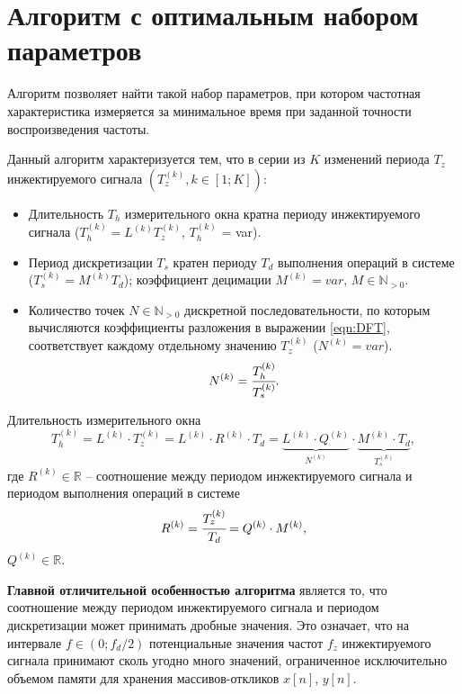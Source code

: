 \section{Алгоритм с оптимальным набором параметров}\label{sec:fr_optim}

Алгоритм позволяет найти такой набор параметров, при котором частотная характеристика измеряется за минимальное время при заданной точности воспроизведения частоты.

Данный алгоритм характеризуется тем, что в серии из $K$ изменений периода ${T_{z}}$ инжектируемого сигнала ${\left({T^{(k)}_{z}}, k \in \left[1;K \right]\right) }$:
\begin{itemize}
    \item Длительность ${T_{h}}$ измерительного окна кратна периоду инжектируемого сигнала (${T^{(k)}_{h} = L^{(k)}T^{(k)}_{z}}$, ${T^{(k)}_{h}}$ = var).
    \item Период дискретизации ${T_{s}}$ кратен периоду ${T_{d}}$ выполнения операций в системе (${T^{(k)}_{s} = M^{(k)} T_d}$); коэффициент децимации ${M^{(k)} = var}$, ${M \in \mathbb{N}_{> 0}}$.
    \item Количество точек ${N \in \mathbb{N}_{> 0}}$ дискретной последовательности, по которым вычисляются коэффициенты разложения в выражении \eqref{eqn:DFT}, соответствует каждому отдельному значению ${T^{(k)}_{z}}$ (${N^{(k)} = var}$).
    \begin{equation*}
        N^{(k)} = \cfrac{T^{(k)}_{h}} {T^{(k)}_{s}}.
    \end{equation*}
\end{itemize}

Длительность измерительного окна
\begin{equation}\label{eqn:windowlength}
    T^{(k)}_{h} = L^{(k)} \cdot T^{(k)}_{z} = L^{(k)} \cdot R^{(k)} \cdot T_{d} = \underbrace{L^{(k)} \cdot Q^{(k)}}_{N^{(k)}} \cdot \underbrace{M^{(k)} \cdot T_d}_{T^{(k)}_{s}},
\end{equation}
где ${R^{(k)} \in \mathbb{R}}$ -- соотношение между периодом инжектируемого сигнала и периодом выполнения операций в системе
\begin{equation*}
    R^{(k)} = \cfrac{T^{(k)}_{z}} {T_{d}} = Q^{(k)} \cdot M^{(k)},
\end{equation*}
${Q^{(k)} \in \mathbb{R}}$.

\textbf{Главной отличительной особенностью алгоритма} является то, что соотношение между периодом инжектируемого сигнала и периодом дискретизации может принимать дробные значения. Это означает, что на интервале ${f \in \left(0; {f_{d} / 2} \right)}$ потенциальные значения частот ${f_{z}}$ инжектируемого сигнала принимают сколь угодно много значений, ограниченное исключительно объемом памяти для хранения массивов-откликов ${x\left[n\right]}$, ${y\left[n\right]}$.

